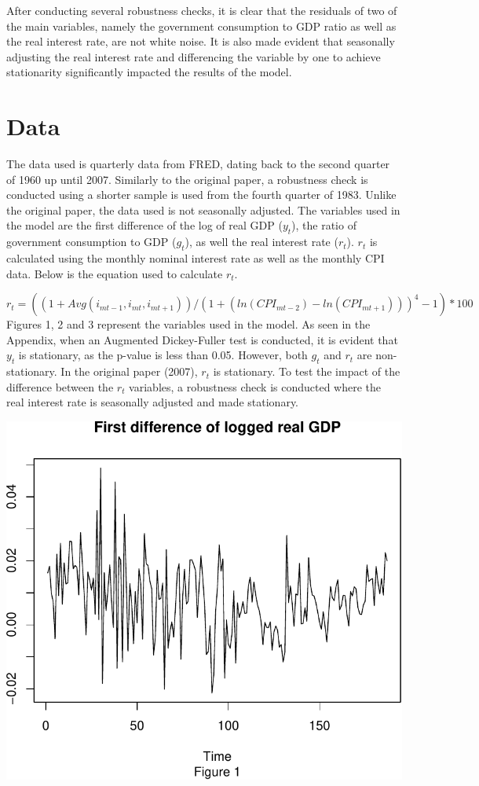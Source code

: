 \documentclass[11pt,preprint, authoryear]{elsarticle}
\numberwithin{equation}{section}
\numberwithin{figure}{section}
\numberwithin{table}{section}
\begin{document}
After conducting several robustness checks, it is clear that the
residuals of two of the main variables, namely the government
consumption to GDP ratio as well as the real interest rate, are not
white noise. It is also made evident that seasonally adjusting the real
interest rate and differencing the variable by one to achieve
stationarity significantly impacted the results of the model.

\hypertarget{data}{%
\section{Data}\label{data}}

The data used is quarterly data from FRED, dating back to the second
quarter of 1960 up until 2007. Similarly to the original paper, a
robustness check is conducted using a shorter sample is used from the
fourth quarter of 1983. Unlike the original paper, the data used is not
seasonally adjusted. The variables used in the model are the first
difference of the log of real GDP (\(y_t\)), the ratio of government
consumption to GDP (\(g_t\)), as well the real interest rate (\(r_t\)).
\(r_t\) is calculated using the monthly nominal interest rate as well as
the monthly CPI data. Below is the equation used to calculate \(r_t\).

\[ r_t = ((1 + Avg(i_{mt-1}, i_{mt}, i_{mt+1}))/(1+(ln(CPI_{mt-2}) - ln(CPI_{mt+1}))) ^ 4 - 1)*100 \]
Figures 1, 2 and 3 represent the variables used in the model. As seen in
the Appendix, when an Augmented Dickey-Fuller test is conducted, it is
evident that \(y_t\) is stationary, as the p-value is less than 0.05.
However, both \(g_t\) and \(r_t\) are non-stationary. In the original
paper (2007), \(r_t\) is stationary. To test the impact of the
difference between the \(r_t\) variables, a robustness check is
conducted where the real interest rate is seasonally adjusted and made
stationary.

\includegraphics{TS_proj_files/figure-latex/unnamed-chunk-12-1.pdf}
\end{document}

